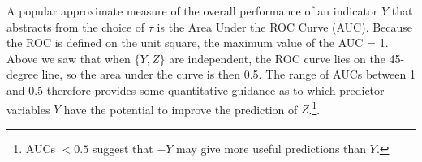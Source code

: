 \documentclass[11pt,a4paper]{article}
\begin{document}
A popular approximate measure of the overall performance of an indicator $Y$ that abstracts from the choice of $\tau$ is the Area Under the ROC Curve (AUC). Because the ROC is defined on the unit square, the maximum value of the AUC = 1. Above we saw that when $\{Y,Z\}$ are independent, the ROC curve lies on the 45-degree line, so the area under the curve is then 0.5. The range of AUCs between 1 and 0.5 therefore provides some quantitative guidance as to which predictor variables $Y$ have the potential to improve the prediction of $Z$.\footnote{AUCs $< 0.5$ suggest that $-Y$ may give more useful predictions than $Y$.}. 

\end{document}
